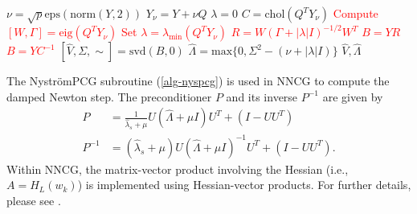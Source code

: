 \begin{algorithm}[H] 
   \caption{RandomizedNystr{\"o}mApproximation}
   \label{alg-RNA}
    \begin{algorithmic}
        
        
       \STATE $\nu = \sqrt{p} \text{eps}(\text{norm}(Y, 2))$ \hfill {}
       \STATE $Y_{\nu} = Y + \nu Q$ \hfill {}
       \STATE $\lambda = 0$ \hfill {}
       \STATE $C = \text{chol}(Q^TY_\nu)$ \hfill {}
       \textcolor{red}{
        \STATE Compute $[W, \Gamma] = \mathrm{eig}(Q^T Y_\nu)$ \hfill {}
        \STATE Set $\lambda = \lambda_{\min}(Q^T Y_\nu)$
        \STATE $R = W(\Gamma + |\lambda| I)^{-1/2} W^T$
        \STATE $B = YR$ \hfill {}
       \ELSE
        \STATE $B = YC^{-1}$ \hfill {}
       \ENDIF
       }
       \STATE $[\hat V, \Sigma, \sim] = \text{svd}(B, 0)$ \hfill {}
       \STATE $\hat \Lambda = \text{max}\{0, \Sigma^2 - (\nu + |\lambda| I)\}$ \hfill {}
        $\hat V, \hat \Lambda$
    \end{algorithmic}
\end{algorithm} 

The Nystr\"{o}mPCG subroutine (\cref{alg-nyspcg}) is used in NNCG to compute the damped Newton step.
The preconditioner $P$ and its inverse $P^{-1}$ are given by 
\begin{align*}
    P &= \frac{1}{\hat{\lambda}_s + \mu} U (\hat{\Lambda} + \mu I) U^T + (I - UU^T) \\
    P^{-1} &= (\hat{\lambda}_s + \mu) U (\hat{\Lambda} + \mu I)^{-1} U^T + (I - UU^T).
\end{align*}
Within NNCG, the matrix-vector product involving the Hessian (i.e., $A = H_L(w_k)$) is implemented using Hessian-vector products.
For further details, please see \citet{frangella2023randomized}.

